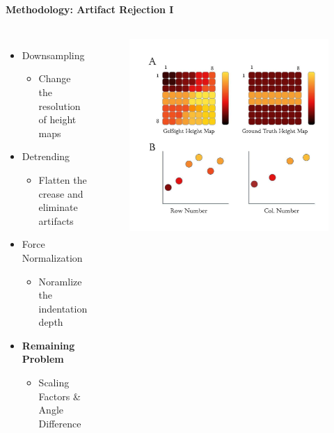 \documentclass[
11pt,notheorems,hyperref={pdfauthor=whatever}
]{beamer}
\begin{document}
\begin{frame}
    \framesubtitle{Methodology: Artifact Rejection I}
    \begin{columns}[T,onlytextwidth]
            \begin{itemize}
                \item Downsampling
                \begin{itemize}
                    \item Change the resolution of height maps
                \end{itemize}
                \item Detrending
                \begin{itemize}
                    \item Flatten the crease and eliminate artifacts
                \end{itemize}
                \item Force Normalization
                \begin{itemize}
                    \item Noramlize the indentation depth
                \end{itemize}
                \item \textbf{Remaining Problem}
                \begin{itemize}
                    \item Scaling Factors \& Angle Difference
                \end{itemize}
            \end{itemize}
            \vspace{-50px}
            \begin{figure}[h]
                \renewcommand{\figurename}{Figure 12}
                \includegraphics [scale=0.9] {Neuro_Detrending.jpg} 

\end{figure}
\end{columns}
\end{frame}
\end{document}
